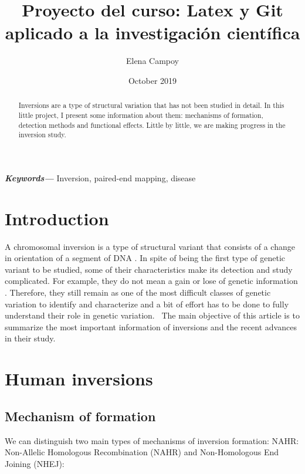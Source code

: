 \documentclass[a4paper,12pt]{article}
\title{Proyecto del curso: Latex y Git aplicado a la investigación científica}
\author{Elena Campoy}
\date{October 2019}
\providecommand{\keywords}[1]
{
  \small	
  \textbf{\textit{Keywords---}} #1
}
\begin{document}
\maketitle

\begin{abstract}
Inversions are a type of structural variation that has not been studied in detail. In this little project, I present some information about them: mechanisms of formation, detection methods and functional effects. Little by little, we are making progress in the inversion study.
\end{abstract}

\keywords{Inversion, paired-end mapping, disease}

\section{Introduction}
A chromosomal inversion is a type of structural variant that consists of a change in orientation of a segment of DNA \cite{puig_human_2015, giner-delgado_evolutionary_2019}. In spite of being the first type of genetic variant to be studied, some of their characteristics make its detection and study complicated. For example, they do not mean a gain or lose of genetic information \cite{giner-delgado_evolutionary_2019}. Therefore, they still remain as one of the most difficult classes of genetic variation to identify and characterize \cite{puig_determining_2019} and a bit of effort has to be done to fully understand their role in genetic variation. 
\
The main objective of this article is to summarize the most important information of inversions and the recent advances in their study. 
\section{Human inversions}

\subsection{Mechanism of formation}
We can distinguish two main types of mechanisms of inversion formation: NAHR: Non-Allelic Homologous Recombination (NAHR) and Non-Homologous End Joining (NHEJ):
\end{document}
